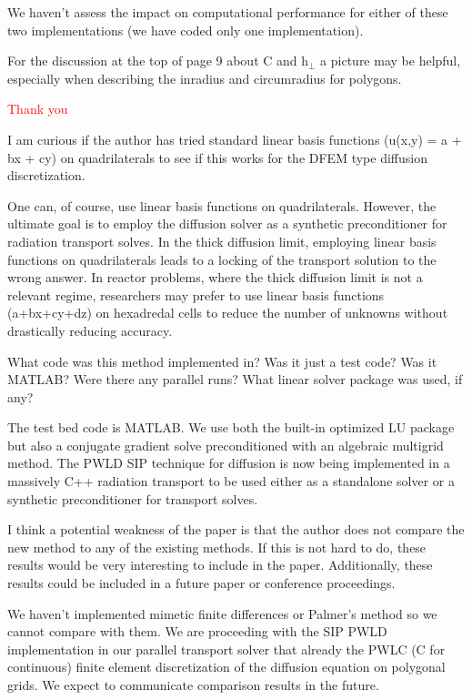 \documentclass{article}
\newcommand{\tcr}[1]{\textcolor{red}{#1}}
\begin{document}
We haven't assess the impact on computational performance for either of these two implementations (we have coded only one implementation).

\bigskip

{
\color{blue}
For the discussion at the top of page 9 about C and h$_\perp$ a picture may be helpful, especially when
describing the inradius and circumradius for polygons.
}


\tcr{Thank you}
\bigskip


{
\color{blue}
I am curious if the author has tried standard linear basis functions (u(x,y) = a + bx + cy) on
quadrilaterals to see if this works for the DFEM type diffusion discretization.
}

One can, of course, use linear basis functions on quadrilaterals. However, the ultimate goal is to employ
the diffusion solver as a synthetic preconditioner for radiation transport solves. In the thick diffusion limit,
employing linear basis functions on quadrilaterals leads to a locking of the transport solution to the 
wrong answer. In reactor problems, where the thick diffusion limit is not a relevant regime, researchers
may prefer to use linear basis functions (a+bx+cy+dz) on hexadredal cells to reduce the number of unknowns
without drastically reducing accuracy.

\bigskip

{
\color{blue}
What code was this method implemented in? Was it just a test code? Was it MATLAB? Were there any
parallel runs? What linear solver package was used, if any?
}

The test bed code is MATLAB. We use both the built-in optimized LU package but also a conjugate gradient solve
preconditioned with an algebraic multigrid method. The PWLD SIP technique for diffusion is now being 
implemented in a massively C++ radiation transport to be used either as a standalone solver or a 
synthetic preconditioner for transport solves. 



\bigskip


{
\color{blue}
I think a potential weakness of the paper is that the author does not compare the new method to any of
the existing methods. If this is not hard to do, these results would be very interesting to include in the
paper. Additionally, these results could be included in a future paper or conference proceedings.
}

We haven't implemented mimetic finite differences or Palmer's method so we cannot compare with them. We are
proceeding with the SIP PWLD implementation in our parallel transport solver that already the PWLC (C for continuous)
finite element discretization of the diffusion equation on polygonal grids. We expect to communicate comparison
results in the future.
 \bigskip
\end{document}
